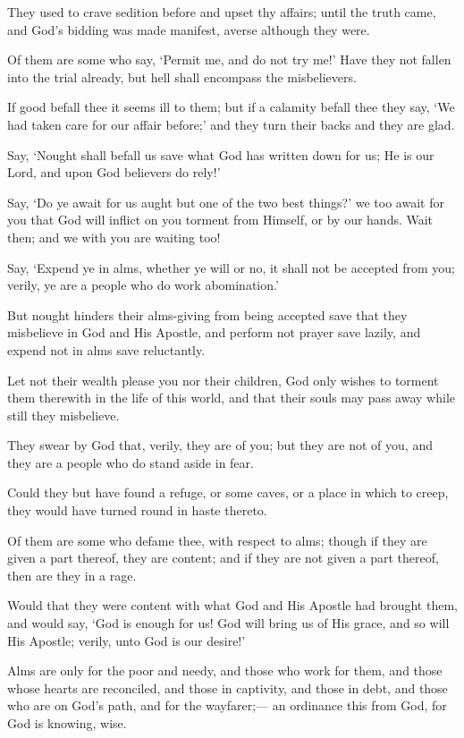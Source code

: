 \documentclass[fontsize=14pt, letterpaper, notitlepage, openany, DIV=12]{scrbook} %
\begin{document}
\noindent[9:48]
They used to crave sedition before and upset thy affairs; until the truth came, and God's
bidding was made manifest, averse although they were.

\noindent[9:49]
Of them are some who say, `Permit me, and do not try me!' Have they not fallen into the
trial already, but hell shall encompass the misbelievers.

\noindent[9:50]
If good befall thee it seems ill to them; but if a calamity befall thee they say, `We had
taken care for our affair before;' and they turn their backs and they are glad.

\noindent[9:51]
Say, `Nought shall befall us save what God has written down for us; He is our Lord, and
upon God believers do rely!'

\noindent[9:52]
Say, `Do ye await for us aught but one of the two best things?' we too await for you that
God will inflict on you torment from Himself, or by our hands. Wait then; and we with you are
waiting too!

\noindent[9:53]
Say, `Expend ye in alms, whether ye will or no, it shall not be accepted from you; verily,
ye are a people who do work abomination.'

\noindent[9:54]
But nought hinders their alms-giving from being accepted save that they misbelieve in
God and His Apostle, and perform not prayer save lazily, and expend not in alms save
reluctantly.

\noindent[9:55]
Let not their wealth please you nor their children, God only wishes to torment them
therewith in the life of this world, and that their souls may pass away while still they misbelieve.

\noindent[9:56]
They swear by God that, verily, they are of you; but they are not of you, and they are a
people who do stand aside in fear.

\noindent[9:57]
Could they but have found a refuge, or some caves, or a place in which to creep, they
would have turned round in haste thereto.

\noindent[9:58]
Of them are some who defame thee, with respect to alms; though if they are given a part
thereof, they are content; and if they are not given a part thereof, then are they in a rage.

\noindent[9:59]
Would that they were content with what God and His Apostle had brought them, and
would say, `God is enough for us! God will bring us of His grace, and so will His Apostle;
verily, unto God is our desire!'

\noindent[9:60]
Alms are only for the poor and needy, and those who work for them, and those whose
hearts are reconciled, and those in captivity, and those in debt, and those who are on God's path,
and for the wayfarer;--- an ordinance this from God, for God is knowing, wise.
\end{document}
